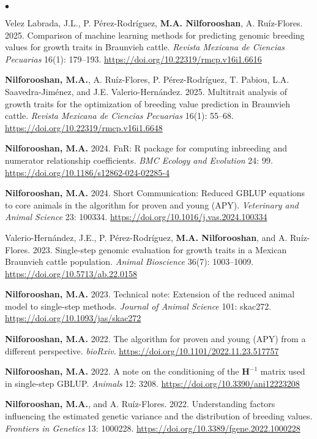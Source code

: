 \documentclass[margin,line]{res}
\newenvironment{list2}{
  \begin{list}{$\bullet$}{%
      \setlength{\itemsep}{0in}
      \setlength{\parsep}{0in} \setlength{\parskip}{0in}
      \setlength{\topsep}{0in} \setlength{\partopsep}{0in}
      \setlength{\leftmargin}{0.2in}}}{\end{list}}
\begin{document}
\begin{resume}
  \begin{list2}
    \item Velez Labrada, J.L., P. P\'{e}rez-Rodr\'{i}guez, {\bf M.A. Nilforooshan}, A. Ru\'{i}z-Flores. 2025. Comparison of machine learning methods for predicting genomic breeding values for growth traits in Braunvieh cattle. {\em Revista Mexicana de Ciencias Pecuarias} 16(1): 179--193. \url{https://doi.org/10.22319/rmcp.v16i1.6616}
    \item {\bf Nilforooshan, M.A.}, A. Ru\'{i}z-Flores, P. P\'{e}rez-Rodr\'{i}guez, T. Pabiou, L.A. Saavedra-Jim\'{e}nez, and J.E. Valerio-Hern\'{a}ndez. 2025. Multitrait analysis of growth traits for the optimization of breeding value prediction in Braunvieh cattle. {\em Revista Mexicana de Ciencias Pecuarias} 16(1): 55--68. \url{https://doi.org/10.22319/rmcp.v16i1.6648}
    \item {\bf Nilforooshan, M.A.} 2024. FnR: R package for computing inbreeding and numerator relationship coefficients. {\em BMC Ecology and Evolution} 24: 99. \url{https://doi.org/10.1186/s12862-024-02285-4}
    \item {\bf Nilforooshan, M.A.} 2024. Short Communication: Reduced GBLUP equations to core animals in the algorithm for proven and young (APY). {\em Veterinary and Animal Science} 23: 100334. \url{https://doi.org/10.1016/j.vas.2024.100334}
    \item Valerio-Hern\'{a}ndez, J.E., P. P\'{e}rez-Rodr\'{i}guez, {\bf M.A. Nilforooshan}, and A. Ru\'{i}z-Flores. 2023. Single-step genomic evaluation for growth traits in a Mexican Braunvieh cattle population. {\em Animal Bioscience} 36(7): 1003--1009. \url{https://doi.org/10.5713/ab.22.0158}
    \item {\bf Nilforooshan, M.A.} 2023. Technical note: Extension of the reduced animal model to single-step methods. {\em Journal of Animal Science} 101: skac272. \url{https://doi.org/10.1093/jas/skac272}
    \item {\bf Nilforooshan, M.A.} 2022. The algorithm for proven and young (APY) from a different perspective. {\em bioRxiv}. \url{https://doi.org/10.1101/2022.11.23.517757}
    \item {\bf Nilforooshan, M.A.} 2022. A note on the conditioning of the $\mathbf H^{-1}$ matrix used in single-step GBLUP. {\em Animals} 12: 3208. \url{https://doi.org/10.3390/ani12223208}
    \item {\bf Nilforooshan, M.A.}, and A. Ru\'{i}z-Flores. 2022. Understanding factors influencing the estimated genetic variance and the distribution of breeding values. {\em Frontiers in Genetics} 13: 1000228. \url{https://doi.org/10.3389/fgene.2022.1000228}

\end{list2}
\end{resume}
\end{document}
